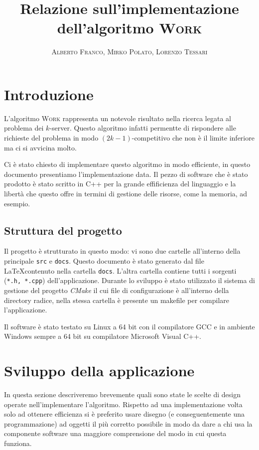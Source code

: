 \documentclass[a4paper, 10pt]{article}
\begin{document}
    \title{Relazione sull'implementazione dell'algoritmo \textsc{Work}}
    \author{\textsc{Alberto Franco, Mirko Polato, Lorenzo Tessari}}
    \maketitle

\section{Introduzione}    
L'algoritmo \textsc{Work} rappresenta un notevole risultato nella ricerca
legata al problema dei $k$-server. Questo algoritmo infatti permentte di 
rispondere alle richieste del problema in modo $(2k - 1)$-competitivo che 
non è il limite inferiore ma ci si avvicina molto. 

Ci è stato chiesto di implementare questo algoritmo in modo efficiente, in 
questo documento presentiamo l'implementazione data. Il pezzo di software che 
è stato prodotto è stato scritto in C++ per la grande effificienza del 
linguaggio e la libertà che questo offre in termini di gestione delle risorse,
come la memoria, ad esempio.

\subsection{Struttura del progetto}
Il progetto è strutturato in questo modo: vi sono due cartelle all'interno della
principale \texttt{src} e \texttt{docs}. Questo documento è stato generato dal 
file \LaTeX contenuto nella cartella \texttt{docs}. L'altra cartella contiene 
tutti i sorgenti (\texttt{*.h, *.cpp}) dell'applicazione. Durante lo sviluppo
è stato utilizzato il sistema di gestione del progetto \emph{CMake} il cui
file di configurazione è all'interno della directory radice, nella stessa
cartella è presente un makefile per compilare l'applicazione. 

Il software è stato testato su Linux a 64 bit con il compilatore GCC e in 
ambiente Windows sempre a 64 bit su compilatore Microsoft Visual C++.

\section{Sviluppo della applicazione}
In questa sezione descriveremo brevemente quali sono state le scelte di design
operate nell'implementare l'algoritmo. Rispetto ad una implementazione volta
solo ad ottenere efficienza si è preferito usare disegno (e conseguentemente
una programmazione) ad oggetti il più corretto possibile in modo da dare 
a chi usa la componente software una maggiore comprensione del modo in cui questa
funziona. 
\end{document}
